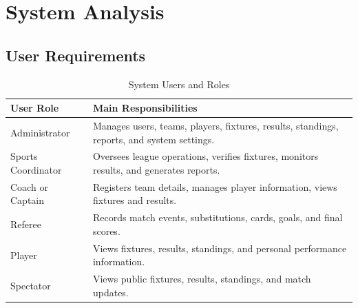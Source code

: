 \documentclass[12pt,a4paper]{report}
\begin{document}
\section{System Analysis}

\subsection{User Requirements}
\begin{table}[H]
\centering
\caption{System Users and Roles}
\begin{tabular}{p{4cm}p{10cm}}
\toprule
\textbf{User Role} & \textbf{Main Responsibilities}\\
\midrule
Administrator & Manages users, teams, players, fixtures, results, standings, reports, and system settings.\\
Sports Coordinator & Oversees league operations, verifies fixtures, monitors results, and generates reports.\\
Coach or Captain & Registers team details, manages player information, views fixtures and results.\\
Referee & Records match events, substitutions, cards, goals, and final scores.\\
Player & Views fixtures, results, standings, and personal performance information.\\
Spectator & Views public fixtures, results, standings, and match updates.\\
\bottomrule
\end{tabular}
\end{table}
\end{document}
